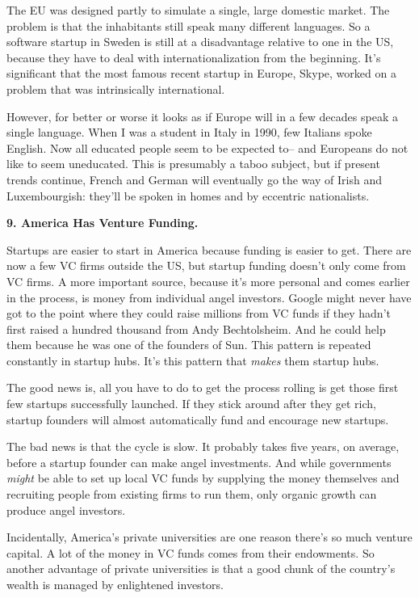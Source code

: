 The EU was designed partly to simulate a single, large domestic market.
The problem is that the inhabitants still speak many different
languages. So a software startup in Sweden is still at a disadvantage
relative to one in the US, because they have to deal with
internationalization from the beginning. It's significant that the most
famous recent startup in Europe, Skype, worked on a problem that was
intrinsically international.

However, for better or worse it looks as if Europe will in a few decades
speak a single language. When I was a student in Italy in 1990, few
Italians spoke English. Now all educated people seem to be expected to--
and Europeans do not like to seem uneducated. This is presumably a taboo
subject, but if present trends continue, French and German will
eventually go the way of Irish and Luxembourgish: they'll be spoken in
homes and by eccentric nationalists.

\textbf{9. America Has Venture Funding.}

Startups are easier to start in America because funding is easier to
get. There are now a few VC firms outside the US, but startup funding
doesn't only come from VC firms. A more important source, because it's
more personal and comes earlier in the process, is money from individual
angel investors. Google might never have got to the point where they
could raise millions from VC funds if they hadn't first raised a hundred
thousand from Andy Bechtolsheim. And he could help them because he was
one of the founders of Sun. This pattern is repeated constantly in
startup hubs. It's this pattern that \emph{makes} them startup hubs.

The good news is, all you have to do to get the process rolling is get
those first few startups successfully launched. If they stick around
after they get rich, startup founders will almost automatically fund and
encourage new startups.

The bad news is that the cycle is slow. It probably takes five years, on
average, before a startup founder can make angel investments. And while
governments \emph{might} be able to set up local VC funds by supplying
the money themselves and recruiting people from existing firms to run
them, only organic growth can produce angel investors.

Incidentally, America's private universities are one reason there's so
much venture capital. A lot of the money in VC funds comes from their
endowments. So another advantage of private universities is that a good
chunk of the country's wealth is managed by enlightened investors.

